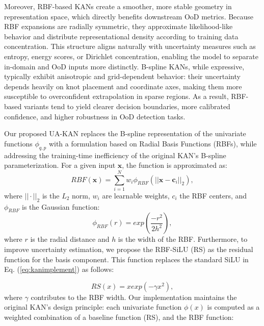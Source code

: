 \documentclass[conference]{IEEEtran}
\begin{document}
Moreover, RBF-based KANs create a smoother, more stable geometry in representation space, which directly benefits downstream OoD metrics. Because RBF expansions are radially symmetric, they approximate likelihood-like behavior and distribute representational density according to training data concentration. This structure aligns naturally with uncertainty measures such as entropy, energy scores, or Dirichlet concentration, enabling the model to separate in-domain and OoD inputs more distinctly. B-spline KANs, while expressive, typically exhibit anisotropic and grid-dependent behavior: their uncertainty depends heavily on knot placement and coordinate axes, making them more susceptible to overconfident extrapolation in sparse regions. As a result, RBF-based variants tend to yield clearer decision boundaries, more calibrated confidence, and higher robustness in OoD detection tasks.

Our proposed UA-KAN replaces the B-spline representation of the univariate functions $\phi_{q,p}$ with a formulation based on Radial Basis Functions (RBFs), while addressing the training-time inefficiency of the original KAN's B-spline parameterization. For a given input 
$\mathbf{x}$, the function is approximated as:
\begin{equation} \label{eq:rbfkan}
RBF(\mathbf{x}) = \sum^N_{i=1} w_i\phi_{RBF}(||\mathbf{x}-\mathbf{c}_i||_2),
\end{equation}
where $|| \cdot ||_2$ is the $L_2$ norm, $w_i$ are learnable weights, $c_i$ the RBF centers, and $\phi_{RBF}$ is the Gaussian function:   
\begin{equation} \label{eq:rbfeq}
\phi_{RBF}(r) = exp(\frac{-r^2}{2h^2}),
\end{equation}
where $r$ is the radial distance and $h$ is the width of the RBF. Furthermore, to improve uncertainty estimation, we propose the RBF-SiLU (RS) as the residual function for the basis component. This function replaces the standard SiLU in Eq. (\ref{eq:kanimplement}) as follows:




\begin{equation} \label{eq:rbfsilu}
RS(x) = xexp(-\gamma x^2),
\end{equation}
where $\gamma$ contributes to the RBF width. Our implementation maintains the original KAN's design principle: each univariate function $\phi(x)$ is computed as a weighted combination of a baseline function (RS), and the RBF function:
\end{document}
